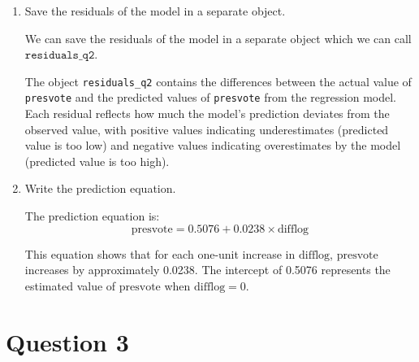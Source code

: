 \documentclass[12pt,letterpaper]{article}
\begin{document}
\begin{enumerate}
		\vspace{2cm}
		\item Save the residuals of the model in a separate object.
		
		We can save the residuals of the model in a separate object which we can call \(\texttt{residuals\_q2}\).
		
		
		
		The object \texttt{residuals\_q2} contains the differences between the actual value of \texttt{presvote}  and the predicted values of  \texttt{presvote}  from the regression model. Each residual reflects how much the model’s prediction deviates from the observed value, with positive values indicating underestimates (predicted value is too low) and negative values indicating overestimates by the model (predicted value is too high).
		
		\vspace{1cm}
		\item Write the prediction equation.
		
		The prediction equation is:
		\[
		\text{presvote} = 0.5076 + 0.0238 \times \text{difflog}
		\]
		
		This equation shows that for each one-unit increase in \(\text{difflog}\), \(\text{presvote}\) increases by approximately 0.0238. The intercept of 0.5076 represents the estimated value of \(\text{presvote}\) when \(\text{difflog} = 0\).
		
		
	\end{enumerate}
	
	\newpage	
\section*{Question 3}
\end{document}
